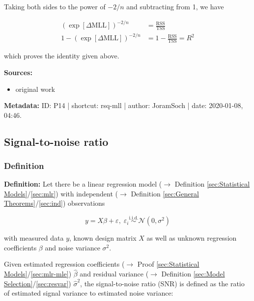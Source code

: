 \documentclass[a4paper,12pt,twoside]{book}
\begin{document}
Taking both sides to the power of $-2/n$ and subtracting from 1, we have

\begin{equation} \label{eq:rsq-mll-MLR-DMLL-R2}
\begin{split}
\left( \exp[\Delta\mathrm{MLL}] \right)^{-2/n} &= \frac{\mathrm{RSS}}{\mathrm{TSS}} \\
1 - \left( \exp[\Delta\mathrm{MLL}] \right)^{-2/n} &= 1 - \frac{\mathrm{RSS}}{\mathrm{TSS}} = R^2
\end{split}
\end{equation}

which proves the identity given above.


\vspace{1em}
\textbf{Sources:}
\begin{itemize}
\item original work\end{itemize}


\vspace{1em}
\textbf{Metadata:} ID: P14 | shortcut: rsq-mll | author: JoramSoch | date: 2020-01-08, 04:46.
\vspace{1em}



\subsection{Signal-to-noise ratio}

\subsubsection[\textit{Definition}]{Definition} \label{sec:snr}
\setcounter{equation}{0}

\textbf{Definition:} Let there be a linear regression model ($\rightarrow$ Definition \ref{sec:Statistical Models}/\ref{sec:mlr}) with independent ($\rightarrow$ Definition \ref{sec:General Theorems}/\ref{sec:ind}) observations

\begin{equation} \label{eq:snr-mlr}
y = X\beta + \varepsilon, \; \varepsilon_i \overset{\mathrm{i.i.d.}}{\sim} \mathcal{N}(0, \sigma^2)
\end{equation}

with measured data $y$, known design matrix $X$ as well as unknown regression coefficients $\beta$ and noise variance $\sigma^2$.

Given estimated regression coefficients ($\rightarrow$ Proof \ref{sec:Statistical Models}/\ref{sec:mlr-mle}) $\hat{\beta}$ and residual variance ($\rightarrow$ Definition \ref{sec:Model Selection}/\ref{sec:resvar}) $\hat{\sigma}^2$, the signal-to-noise ratio (SNR) is defined as the ratio of estimated signal variance to estimated noise variance:
\end{document}
